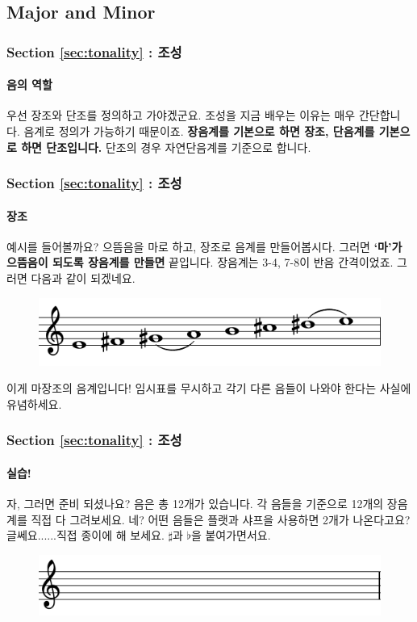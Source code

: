 \documentclass{beamer}
\begin{document}
	\subsection{Major and Minor}
	\begin{frame}
		\frametitle{Section \ref{sec:tonality} : 조성}
		\framesubtitle{음의 역할}
		우선 장조와 단조를 정의하고 가야겠군요. 조성을 지금 배우는 이유는 매우 간단합니다. 음계로 정의가 가능하기 때문이죠. {\bf 장음계를 기본으로 하면 장조, 단음계를 기본으로 하면 단조입니다.} 단조의 경우 자연단음계를 기준으로 합니다.
	\end{frame}
	
	\begin{frame}
		\frametitle{Section \ref{sec:tonality} : 조성}
		\framesubtitle{장조}
		예시를 들어볼까요? 으뜸음을 마로 하고, 장조로 음계를 만들어봅시다. 그러면 {\bf `마'가 으뜸음이 되도록 장음계를 만들면} 끝입니다. 장음계는 3-4, 7-8이 반음 간격이었죠. 그러면 다음과 같이 되겠네요.
		\begin{figure}
			\centering
			\includegraphics[width=\textwidth]{res/pdf/8/scale/major/E_major.pdf}
		\end{figure}
		\vskip -1.5pc
		이게 마장조의 음계입니다! 임시표를 무시하고 각기 다른 음들이 나와야 한다는 사실에 유념하세요.
	\end{frame}
	
	\begin{frame}
		\frametitle{Section \ref{sec:tonality} : 조성}
		\framesubtitle{실습!}
		자, 그러면 준비 되셨나요? 음은 총 12개가 있습니다. 각 음들을 기준으로 12개의 장음계를 직접 다 그려보세요. 네? 어떤 음들은 플랫과 샤프을 사용하면 2개가 나온다고요? 글쎄요......직접 종이에 해 보세요. $\sharp$과 $\flat$을  붙여가면서요.
		\begin{figure}
			\centering
			\includegraphics[width=\textwidth]{res/pdf/8/blank.pdf}
		\end{figure}
	\end{frame}
	
\end{document}
